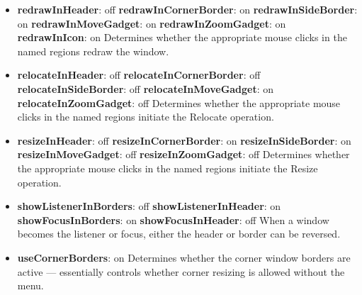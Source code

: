 \begin{itemize}
\item {\bf redrawInHeader}: off\newline{}
{\bf redrawInCornerBorder}: on\newline{}
{\bf redrawInSideBorder}: on\newline{}
{\bf redrawInMoveGadget}: on\newline{}
{\bf redrawInZoomGadget}: on\newline{}
{\bf redrawInIcon}: on\newline{}
Determines whether the appropriate mouse clicks in the named
regions redraw the window.

\item {\bf relocateInHeader}: off\newline{}
{\bf relocateInCornerBorder}: off\newline{}
{\bf relocateInSideBorder}: off\newline{}
{\bf relocateInMoveGadget}: on\newline{}
{\bf relocateInZoomGadget}: off\newline{}
Determines whether the appropriate mouse clicks in the named
regions initiate the Relocate operation.

\item {\bf resizeInHeader}: off\newline{}
{\bf resizeInCornerBorder}: on\newline{}
{\bf resizeInSideBorder}: on\newline{}
{\bf resizeInMoveGadget}: off\newline{}
{\bf resizeInZoomGadget}: off\newline{}
Determines whether the appropriate mouse clicks in the named
regions initiate the Resize operation.

\item {\bf showListenerInBorders}: off\newline{}
{\bf showListenerInHeader}: on\newline{}
{\bf showFocusInBorders}: on\newline{}
{\bf showFocusInHeader}: off\newline{}
When a window becomes the listener or focus, either the header or
border can be reversed.

\item {\bf useCornerBorders}: on\newline{}
Determines whether the corner window borders are active ---
essentially controls whether corner resizing is allowed without
the menu.


\end{itemize}
